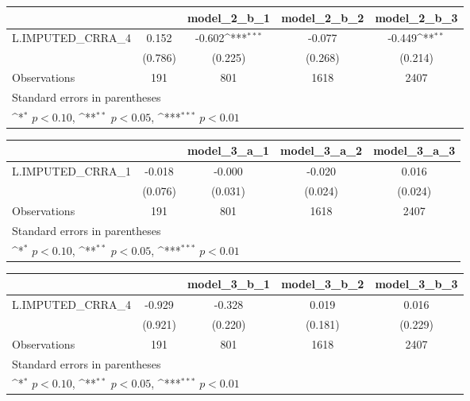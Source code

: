 {
\def\sym#1{\ifmmode^{#1}\else\(^{#1}\)\fi}
\begin{tabular}{l*{4}{c}}
\toprule
                &\multicolumn{1}{c}{}&\multicolumn{1}{c}{model\_2\_b\_1}&\multicolumn{1}{c}{model\_2\_b\_2}&\multicolumn{1}{c}{model\_2\_b\_3}\\
\midrule
L.IMPUTED\_CRRA\_4&    0.152         &   -0.602\sym{***}&   -0.077         &   -0.449\sym{**} \\
                &  (0.786)         &  (0.225)         &  (0.268)         &  (0.214)         \\
\midrule
Observations    &      191         &      801         &     1618         &     2407         \\
\bottomrule
\multicolumn{5}{l}{\footnotesize Standard errors in parentheses}\\
\multicolumn{5}{l}{\footnotesize \sym{*} \(p<0.10\), \sym{**} \(p<0.05\), \sym{***} \(p<0.01\)}\\
\end{tabular}
}
{
\def\sym#1{\ifmmode^{#1}\else\(^{#1}\)\fi}
\begin{tabular}{l*{4}{c}}
\toprule
                &\multicolumn{1}{c}{}&\multicolumn{1}{c}{model\_3\_a\_1}&\multicolumn{1}{c}{model\_3\_a\_2}&\multicolumn{1}{c}{model\_3\_a\_3}\\
\midrule
L.IMPUTED\_CRRA\_1&   -0.018         &   -0.000         &   -0.020         &    0.016         \\
                &  (0.076)         &  (0.031)         &  (0.024)         &  (0.024)         \\
\midrule
Observations    &      191         &      801         &     1618         &     2407         \\
\bottomrule
\multicolumn{5}{l}{\footnotesize Standard errors in parentheses}\\
\multicolumn{5}{l}{\footnotesize \sym{*} \(p<0.10\), \sym{**} \(p<0.05\), \sym{***} \(p<0.01\)}\\
\end{tabular}
}
{
\def\sym#1{\ifmmode^{#1}\else\(^{#1}\)\fi}
\begin{tabular}{l*{4}{c}}
\toprule
                &\multicolumn{1}{c}{}&\multicolumn{1}{c}{model\_3\_b\_1}&\multicolumn{1}{c}{model\_3\_b\_2}&\multicolumn{1}{c}{model\_3\_b\_3}\\
\midrule
L.IMPUTED\_CRRA\_4&   -0.929         &   -0.328         &    0.019         &    0.016         \\
                &  (0.921)         &  (0.220)         &  (0.181)         &  (0.229)         \\
\midrule
Observations    &      191         &      801         &     1618         &     2407         \\
\bottomrule
\multicolumn{5}{l}{\footnotesize Standard errors in parentheses}\\
\multicolumn{5}{l}{\footnotesize \sym{*} \(p<0.10\), \sym{**} \(p<0.05\), \sym{***} \(p<0.01\)}\\
\end{tabular}
}
